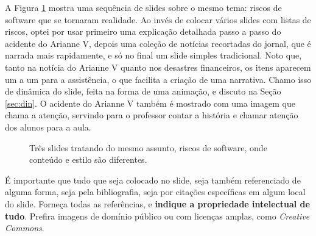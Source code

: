 A Figura \ref{fig:tres} mostra uma sequência de slides sobre o mesmo tema: riscos de software que se tornaram realidade. Ao invés de colocar vários slides com listas de riscos, optei por usar primeiro uma explicação detalhada passo a passo do acidente do Arianne V, depois uma coleção de notícias recortadas do jornal, que é narrada mais rapidamente, e só no final um slide simples tradicional. Noto que, tanto na notícia do Arianne V quanto nos desastres financeiros, os itens aparecem um a um para a assistência, o que facilita a criação de uma narrativa. Chamo isso de dinâmica do slide, feita na forma de uma animação, e discuto na Seção \ref{sec:din}. O acidente do Arianne V também é mostrado com uma imagem que chama a atenção, servindo para o professor contar a história e chamar atenção dos alunos para a aula.

\begin{figure}
    \centering
\caption{Três slides tratando do mesmo assunto, riscos de software, onde conteúdo e estilo são diferentes.}
\label{fig:tres}
\end{figure}


É importante que tudo que seja colocado no slide, seja também referenciado de alguma forma, seja pela bibliografia, seja por citações específicas em algum local do slide.
Forneça todas as referências, e \textbf{indique a propriedade intelectual de tudo}. Prefira imagens de domínio público ou com licenças amplas, como \textit{Creative Commons}.


